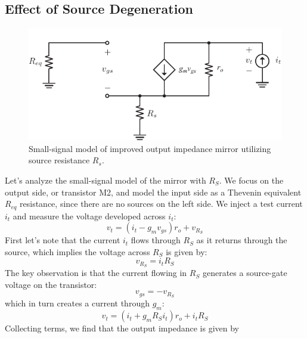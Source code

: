 \subsection{Effect of Source Degeneration}
\begin{figure}[tb]
\centering
\includegraphics[scale=1]{10mirrror_Rs_ss.pdf}
\caption{Small-signal model of improved output impedance mirror utilizing source resistance $R_s$.} \label{fig:10mirrror_Rs_ss.pdf}
\end{figure}
Let's analyze the small-signal model of the mirror with $R_S$.  We focus on the output side, or transistor M2, and model the input side as a Thevenin equivalent $R_{eq}$ resistance, since there are no sources on the left side.  We inject a test current $i_t$ and measure the voltage developed across $i_t$:
    \begin{equation}
        {v_t} = ({i_t} - {g_m}{v_{gs}}){r_o} + {v_{{R_S}}}
    \end{equation}
First let's note that the current $i_t$ flows through $R_S$ as it returns through the source, which implies the voltage across $R_S$ is given by:
    \begin{equation}
        {v_{{R_S}}} = {i_t}{R_S}
    \end{equation}
The key observation is that the current flowing in $R_S$ generates a source-gate voltage on the transistor:
    \begin{equation}
        {v_{gs}} = - {v_{{R_S}}}
    \end{equation}
which in turn creates a current through $g_m$:
    \begin{equation}
        {v_t} = ({i_t} + {g_m}{R_S}{i_t}){r_o} + {i_t}{R_S}
    \end{equation}
Collecting terms, we find that the output impedance is given by
